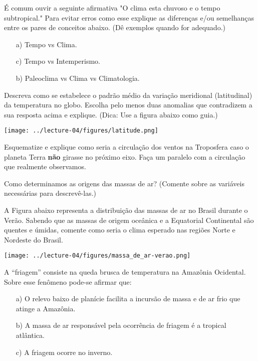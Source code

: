 \documentclass[letterpaper,portuguese,12pt,pdftex]{exam}
\begin{document}
\begin{questions}

\question[2]
É comum ouvir a seguinte afirmativa "O clima esta chuvoso e o tempo
subtropical."  Para evitar erros como esse explique as diferenças e/ou
semelhanças entre os pares de conceitos abaixo.  (Dê exemplos quando for
adequado.)

\begin{itemize}
  \item[a)] Tempo vs Clima.
  \item[c)] Tempo vs Intemperismo.
  \item[b)] Paleoclima vs Clima vs Climatologia.
\end{itemize}

\question[2\half]
Descreva como se estabelece o padrão médio da variação meridional
(latitudinal) da temperatura no globo.  Escolha pelo menos duas anomalias que
contradizem a sua resposta acima e explique. (Dica: Use a figura abaixo como
guia.)

\begin{center}
   \texttt{[image: ../lecture-04/figures/latitude.png]}
\end{center}

\question[3]
Esquematize e explique como seria a circulação dos ventos na Troposfera
caso o planeta Terra {\bf não} girasse no próximo eixo.  Faça um paralelo com a
circulação que realmente observamos.

\question[2\half]
Como determinamos as origens das massas de ar?  (Comente sobre as variáveis
necessárias para descrevê-las.)

\question[1\half]
A Figura abaixo representa a distribuição das massas de ar no Brasil durante
o Verão.  Sabendo que as massas de origem oceânica e a Equatorial Continental
são quentes e úmidas, comente como seria o clima esperado nas regiões Norte e
Nordeste do Brasil.

\begin{center}
  \texttt{[image: ../lecture-04/figures/massa\_de\_ar-verao.png]}
\end{center}

\question[2]
A ``friagem'' consiste na queda brusca de temperatura na Amazônia Ocidental.
Sobre esse fenômeno pode-se afirmar que:

\begin{itemize}
  \item[a)] O relevo baixo de planície facilita a incursão de massa e de ar
            frio que atinge a Amazônia.
  \item[b)] A massa de ar responsável pela ocorrência de friagem é a tropical
            atlântica.
  \item[c)] A friagem ocorre no inverno.
\end{itemize}


\end{questions}
\end{document}

